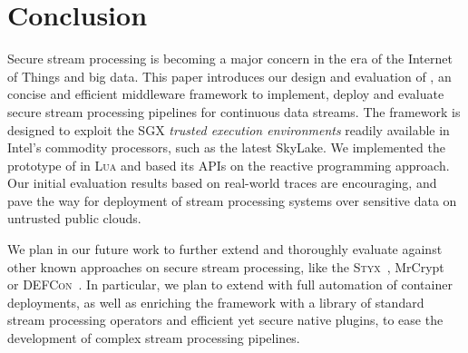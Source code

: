\section{Conclusion}
\label{sec:conclusion}

Secure stream processing is becoming a major concern in the era of the Internet of Things and big data.
This paper introduces our design and evaluation of \SYS{}, an concise and efficient middleware framework to implement, deploy and evaluate secure stream processing pipelines for continuous data streams.
The framework is designed to exploit the SGX \emph{trusted execution environments} readily available in Intel{\textregistered}'s commodity processors, such as the latest SkyLake.
We implemented the prototype of \SYS{} in \textsc{Lua} and based its APIs on the reactive programming approach.
Our initial evaluation results based on real-world traces are encouraging, and pave the way for deployment of stream processing systems over sensitive data on untrusted public clouds.

We plan in our future work to further extend and thoroughly evaluate \SYS against other known approaches on secure stream processing, like the \textsc{Styx}~\cite{Stephen:2016:SSP:2987550.2987574}, MrCrypt~\cite{tetali2013mrcrypt} or \textsc{DEFCon}~\cite{Migliavacca:2010:DHE}.
In particular, we plan to extend \SYS with full automation of container deployments, as well as enriching the framework with a library of standard stream processing operators and efficient yet secure native plugins, to ease the development of complex stream processing pipelines.
